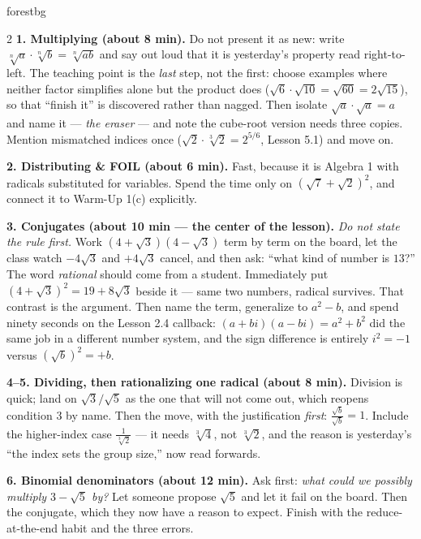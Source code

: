 \documentclass[10pt]{article}
\begin{document}
\begin{skillbox}[Lesson]{forestbg}
\begin{multicols}{2}
\textbf{1. Multiplying (about 8 min).} Do not present it as new: write
$\sqrt[n]{a}\cdot\sqrt[n]{b}=\sqrt[n]{ab}$ and say out loud that it is yesterday's property read
right-to-left. The teaching point is the \emph{last} step, not the first: choose examples where
neither factor simplifies alone but the product does ($\sqrt6\cdot\sqrt{10}=\sqrt{60}=2\sqrt{15}$),
so that ``finish it'' is discovered rather than nagged. Then isolate $\sqrt a\cdot\sqrt a=a$ and
name it --- \emph{the eraser} --- and note the cube-root version needs three copies. Mention
mismatched indices once ($\sqrt2\cdot\sqrt[3]2=2^{5/6}$, Lesson 5.1) and move on.

\textbf{2. Distributing \& FOIL (about 6 min).} Fast, because it is Algebra 1 with radicals
substituted for variables. Spend the time only on $\left(\sqrt7+\sqrt2\right)^{2}$, and connect it
to Warm-Up 1(c) explicitly.

\columnbreak

\textbf{3. Conjugates (about 10 min --- the center of the lesson).} \emph{Do not state the rule
first.} Work $\left(4+\sqrt3\right)\left(4-\sqrt3\right)$ term by term on the board, let the class
watch $-4\sqrt3$ and $+4\sqrt3$ cancel, and then ask: ``what kind of number is $13$?'' The word
\emph{rational} should come from a student. Immediately put $\left(4+\sqrt3\right)^{2}=19+8\sqrt3$
beside it --- same two numbers, radical survives. That contrast is the argument. Then name the
term, generalize to $a^{2}-b$, and spend ninety seconds on the Lesson 2.4 callback:
$(a+bi)(a-bi)=a^{2}+b^{2}$ did the same job in a different number system, and the sign difference is
entirely $i^{2}=-1$ versus $\left(\sqrt b\right)^{2}=+b$.

\textbf{4--5. Dividing, then rationalizing one radical (about 8 min).} Division is quick; land on
$\sqrt3/\sqrt5$ as the one that will not come out, which reopens condition 3 by name. Then the
move, with the justification \emph{first}: $\frac{\sqrt b}{\sqrt b}=1$. Include the higher-index
case $\frac{1}{\sqrt[3]2}$ --- it needs $\sqrt[3]4$, not $\sqrt[3]2$, and the reason is yesterday's
``the index sets the group size,'' now read forwards.

\textbf{6. Binomial denominators (about 12 min).} Ask first: \emph{what could we possibly multiply
$3-\sqrt5$ by?} Let someone propose $\sqrt5$ and let it fail on the board. Then the conjugate,
which they now have a reason to expect. Finish with the reduce-at-the-end habit and the three
errors.
\end{multicols}
\end{skillbox}
\end{document}
